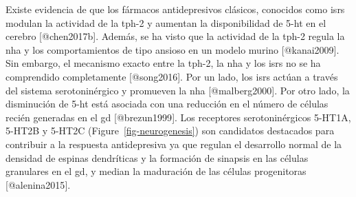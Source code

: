 \documentclass[
  11pt]{../MastersDoctoralThesisUNAM}
\begin{document}
Existe evidencia de que los fármacos antidepresivos
\colorbox{BurntOrange}{clásicos, conocidos como} \ac{isrs} modulan la
actividad de la \ac{tph}-2 y aumentan la disponibilidad de \ac{5-ht} en
el cerebro {[}@chen2017b{]}. Además, se ha visto que la actividad de la
\ac{tph}-2 regula la \ac{nha} y los comportamientos de tipo ansioso en
un modelo murino {[}@kanai2009{]}. Sin embargo, el mecanismo exacto
entre la \ac{tph}-2, la \ac{nha} y los \ac{isrs} no se ha comprendido
completamente {[}@song2016{]}. Por un lado, los \ac{isrs} actúan a
través del sistema serotoninérgico y promueven la \ac{nha}
{[}@malberg2000{]}. Por otro lado, la disminución de \ac{5-ht} está
asociada con una reducción en el número de células recién generadas en
el \ac{gd} {[}@brezun1999{]}. Los receptores serotoninérgicos 5-HT1A,
5-HT2B y 5-HT2C (Figure~\ref{fig-neurogenesis}) son candidatos
destacados para contribuir a la respuesta antidepresiva ya que regulan
el desarrollo normal de la densidad de espinas dendríticas y la
formación de sinapsis en las células granulares en el \ac{gd}, y median
la maduración de las células progenitoras {[}@alenina2015{]}.
\end{document}
